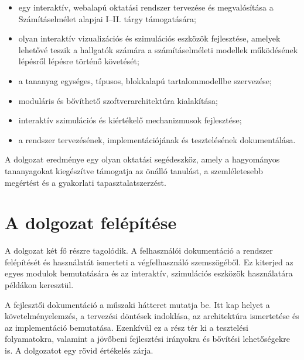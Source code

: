 \begin{itemize}
    \item egy interaktív, webalapú oktatási rendszer tervezése és
          megvalósítása a Számításelmélet alapjai I--II. tárgy támogatására;
    \item olyan interaktív vizualizációs és szimulációs eszközök fejlesztése, amelyek
     lehetővé teszik a hallgatók számára a számításelméleti modellek működésének lépésről 
     lépésre történő követését;
    \item a tananyag egységes, típusos, blokkalapú tartalommodellbe
          szervezése;
    \item moduláris és bővíthető szoftverarchitektúra kialakítása;
    \item interaktív szimulációs és kiértékelő mechanizmusok fejlesztése;
    \item a rendszer tervezésének, implementációjának és tesztelésének
          dokumentálása.
\end{itemize}

A dolgozat eredménye egy olyan oktatási segédeszköz, amely a
hagyományos tananyagokat kiegészítve támogatja az önálló tanulást, a
szemléletesebb megértést és a gyakorlati tapasztalatszerzést.

\section{A dolgozat felépítése}
A dolgozat két fő részre tagolódik.
A felhasználói dokumentáció a rendszer felépítését és használatát
ismerteti a végfelhasználó szemszögéből. Ez kiterjed az egyes modulok
bemutatására és az interaktív, szimulációs eszközök használatára
példákon keresztül.

A fejlesztői dokumentáció a műszaki hátteret mutatja be. Itt kap helyet
a követelményelemzés, a tervezési döntések indoklása, az architektúra
ismertetése és az implementáció bemutatása. Ezenkívül ez a rész tér ki
a tesztelési folyamatokra, valamint a jövőbeni fejlesztési irányokra
és bővítési lehetőségekre is.
A dolgozatot egy rövid értékelés zárja.
